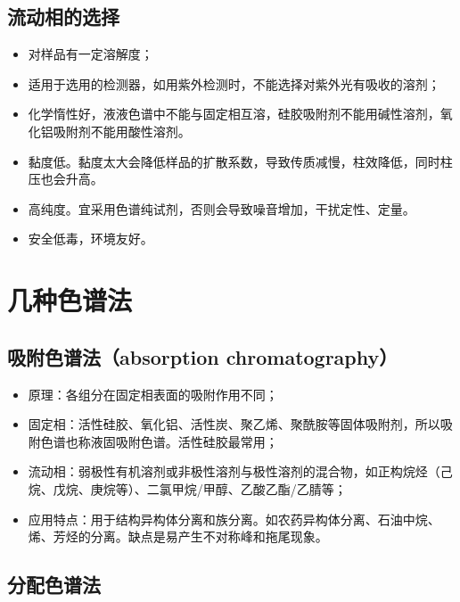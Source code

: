 \subsection{流动相的选择}
\begin{itemize}
	\item 对样品有一定溶解度；
	\item 适用于选用的检测器，如用紫外检测时，不能选择对紫外光有吸收的溶剂；
	\item 化学惰性好，液液色谱中不能与固定相互溶，硅胶吸附剂不能用碱性溶剂，氧化铝吸附剂不能用酸性溶剂。
	\item 黏度低。黏度太大会降低样品的扩散系数，导致传质减慢，柱效降低，同时柱压也会升高。
	\item 高纯度。宜采用色谱纯试剂，否则会导致噪音增加，干扰定性、定量。
	\item 安全低毒，环境友好。
\end{itemize}

\section{几种色谱法}
\subsection{吸附色谱法（absorption chromatography）}

\begin{itemize}
	\item 原理：各组分在固定相表面的吸附作用不同；
	\item 固定相：活性硅胶、氧化铝、活性炭、聚乙烯、聚酰胺等固体吸附剂，所以吸附色谱也称液固吸附色谱。活性硅胶最常用；
	\item 流动相：弱极性有机溶剂或非极性溶剂与极性溶剂的混合物，如正构烷烃（己烷、戊烷、庚烷等）、二氯甲烷/甲醇、乙酸乙酯/乙腈等；
	\item 应用特点：用于结构异构体分离和族分离。如农药异构体分离、石油中烷、烯、芳烃的分离。缺点是易产生不对称峰和拖尾现象。
\end{itemize}

\subsection{分配色谱法}

